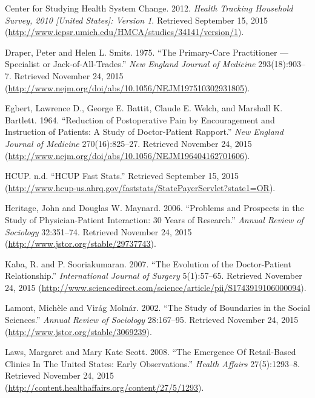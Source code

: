 \documentclass[12pt,twoside]{reedthesis}
\begin{document}
  \hypertarget{ref-HEALTHux5fTRACKINGux5f2012}{}
  Center for Studying Health System Change. 2012. \emph{Health Tracking
  Household Survey, 2010 {[}United States{]}: Version 1}. Retrieved
  September 15, 2015
  (\url{http://www.icpsr.umich.edu/HMCA/studies/34141/version/1}).
  
  \hypertarget{ref-draperux5fprimary-careux5f1975}{}
  Draper, Peter and Helen L. Smits. 1975. ``The Primary-Care Practitioner
  --- Specialist or Jack-of-All-Trades.'' \emph{New England Journal of
  Medicine} 293(18):903--7. Retrieved November 24, 2015
  (\url{http://www.nejm.org/doi/abs/10.1056/NEJM197510302931805}).
  
  \hypertarget{ref-egbertux5freductionux5f1964}{}
  Egbert, Lawrence D., George E. Battit, Claude E. Welch, and Marshall K.
  Bartlett. 1964. ``Reduction of Postoperative Pain by Encouragement and
  Instruction of Patients: A Study of Doctor-Patient Rapport.'' \emph{New
  England Journal of Medicine} 270(16):825--27. Retrieved November 24,
  2015 (\url{http://www.nejm.org/doi/abs/10.1056/NEJM196404162701606}).
  
  \hypertarget{ref-HCUP}{}
  HCUP. n.d. ``HCUP Fast Stats.'' Retrieved September 15, 2015
  (\url{http://www.hcup-us.ahrq.gov/faststats/StatePayerServlet?state1=OR}).
  
  \hypertarget{ref-heritageux5fproblemsux5f2006}{}
  Heritage, John and Douglas W. Maynard. 2006. ``Problems and Prospects in
  the Study of Physician-Patient Interaction: 30 Years of Research.''
  \emph{Annual Review of Sociology} 32:351--74. Retrieved November 24,
  2015 (\url{http://www.jstor.org/stable/29737743}).
  
  \hypertarget{ref-kabaux5fevolutionux5f2007}{}
  Kaba, R. and P. Sooriakumaran. 2007. ``The Evolution of the
  Doctor-Patient Relationship.'' \emph{International Journal of Surgery}
  5(1):57--65. Retrieved November 24, 2015
  (\url{http://www.sciencedirect.com/science/article/pii/S1743919106000094}).
  
  \hypertarget{ref-lamontux5fstudyux5f2002}{}
  Lamont, Michèle and Virág Molnár. 2002. ``The Study of Boundaries in the
  Social Sciences.'' \emph{Annual Review of Sociology} 28:167--95.
  Retrieved November 24, 2015 (\url{http://www.jstor.org/stable/3069239}).
  
  \hypertarget{ref-lawsux5femergenceux5f2008}{}
  Laws, Margaret and Mary Kate Scott. 2008. ``The Emergence Of
  Retail-Based Clinics In The United States: Early Observations.''
  \emph{Health Affairs} 27(5):1293--8. Retrieved November 24, 2015
  (\url{http://content.healthaffairs.org/content/27/5/1293}).
  
\end{document}
